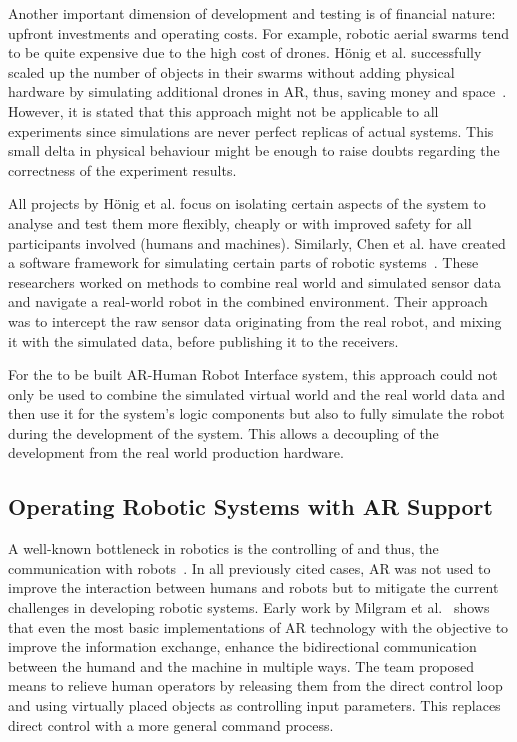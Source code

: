 Another important dimension of development and testing is of financial nature: upfront investments and operating costs. For example, robotic aerial swarms tend to be quite expensive due to the high cost of drones. Hönig et al. successfully scaled up the number of objects in their swarms without adding physical hardware by simulating additional drones in AR, thus, saving money and space~\cite{hoenig2015mixed}. However, it is stated that this approach might not be applicable to all experiments since simulations are never perfect replicas of actual systems. This small delta in physical behaviour might be enough to raise doubts regarding the correctness of the experiment results.

All projects by Hönig et al. focus on isolating certain aspects of the system to analyse and test them more flexibly, cheaply or with improved safety for all participants involved (humans and machines). Similarly, Chen et al. have created a software framework for simulating certain parts of robotic systems~\cite{chen2009mixed}. These researchers worked on methods to combine real world and simulated sensor data and navigate a real-world robot in the combined environment. Their approach was to intercept the raw sensor data originating from the real robot, and mixing it with the simulated data, before publishing it to the receivers.

For the to be built AR-Human Robot Interface system, this approach could not only be used to combine the simulated virtual world and the real world data and then use it for the system's logic components but also to fully simulate the robot during the development of the system. This allows a decoupling of the development from the real world production hardware.

\subsection{Operating Robotic Systems with AR Support}
A well-known bottleneck in robotics is the controlling of and thus, the communication with robots~\cite{RoboticsScienceMag}. In all previously cited cases, AR was not used to improve the interaction between humans and robots but to mitigate the current challenges in developing robotic systems. Early work by Milgram et al.~\cite{milgram1993applications} shows that even the most basic implementations of AR technology with the objective to improve the information exchange, enhance the bidirectional communication between the humand and the machine in multiple ways. The team proposed means to relieve human operators by releasing them from the direct control loop and using virtually placed objects as controlling input parameters. This replaces direct control with a more general command process.

